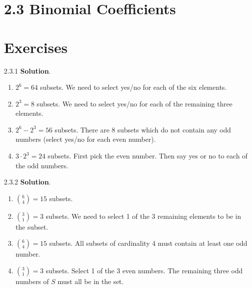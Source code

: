 \documentclass[11pt,]{book}
\theoremstyle{ptxplainnotitle}
\theoremstyle{ptxplaintitle}
\theoremstyle{ptxdefinitionnotitle}
\theoremstyle{ptxdefinitiontitle}
\theoremstyle{ptxdefinitionnotitle}
\theoremstyle{ptxdefinitiontitle}
\theoremstyle{ptxdefinitionnotitle}
\theoremstyle{ptxdefinitiontitle}
\theoremstyle{ptxdefinitiontitlenonumber}
\theoremstyle{ptxdefinitiontitlenonumber}
\numberwithin{equation}{chapter}
\begin{document}
\section*{2.3 Binomial Coefficients}
\section*{Exercises}
\begin{divisionexercise}{2.3.1}
\textbf{Solution}.\quad%
\hypertarget{p-1243}{}%
\leavevmode%
\begin{enumerate}[label=\alph*.]
\item\hypertarget{li-535}{}\hypertarget{p-1244}{}%
\(2^6 = 64\) subsets. We need to select yes/no for each of the six elements.%
\item\hypertarget{li-536}{}\hypertarget{p-1245}{}%
\(2^3 = 8\) subsets.  We need to select yes/no for each of the remaining three elements.%
\item\hypertarget{li-537}{}\hypertarget{p-1246}{}%
\(2^6 - 2^3 = 56\) subsets.  There are 8 subsets which do not contain any odd numbers (select yes/no for each even number).%
\item\hypertarget{li-538}{}\hypertarget{p-1247}{}%
\(3\cdot 2^3 = 24\) subsets.  First pick the even number.  Then say yes or no to each of the odd numbers.%
\end{enumerate}
%
\end{divisionexercise}%
\begin{divisionexercise}{2.3.2}
\textbf{Solution}.\quad%
\hypertarget{p-1265}{}%
\leavevmode%
\begin{enumerate}[label=\alph*.]
\item\hypertarget{li-551}{}\hypertarget{p-1266}{}%
\({6\choose 4} = 15\) subsets.%
\item\hypertarget{li-552}{}\hypertarget{p-1267}{}%
\({3 \choose 1} = 3\) subsets.  We need to select 1 of the 3 remaining elements to be in the subset.%
\item\hypertarget{li-553}{}\hypertarget{p-1268}{}%
\({6 \choose 4} = 15\) subsets.  All subsets of cardinality 4 must contain at least one odd number.%
\item\hypertarget{li-554}{}\hypertarget{p-1269}{}%
\({3 \choose 1} = 3\) subsets.  Select 1 of the 3 even numbers.  The remaining three odd numbers of \(S\) must all be in the set.%
\end{enumerate}
%
\end{divisionexercise}%
\end{document}
